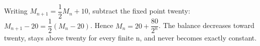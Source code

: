 Writing $M_{n+1}=\dfrac{1}{2}M_n+10$, subtract the fixed point twenty: $M_{n+1}-20=\dfrac{1}{2}(M_n-20)$. Hence $\boxed{M_n=20+\dfrac{80}{2^n}}$. The balance decreases toward twenty, stays above twenty for every finite n, and never becomes exactly constant.
